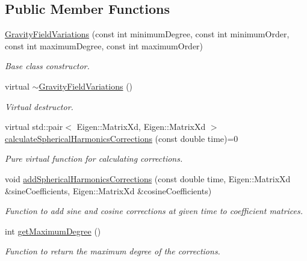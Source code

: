 \subsection*{Public Member Functions}
\begin{DoxyCompactItemize}
\item 
\hyperlink{classtudat_1_1gravitation_1_1GravityFieldVariations_acda33e409345701ee320c046987f3831}{Gravity\+Field\+Variations} (const int minimum\+Degree, const int minimum\+Order, const int maximum\+Degree, const int maximum\+Order)
\begin{DoxyCompactList}\small\item\em Base class constructor. \end{DoxyCompactList}\item 
virtual \hyperlink{classtudat_1_1gravitation_1_1GravityFieldVariations_abc4ba19f0c8593ef85932fc1724626ad}{$\sim$\+Gravity\+Field\+Variations} ()
\begin{DoxyCompactList}\small\item\em Virtual destructor. \end{DoxyCompactList}\item 
virtual std\+::pair$<$ Eigen\+::\+Matrix\+Xd, Eigen\+::\+Matrix\+Xd $>$ \hyperlink{classtudat_1_1gravitation_1_1GravityFieldVariations_ab42ff0b801e14ac4becc0619cc2a28d7}{calculate\+Spherical\+Harmonics\+Corrections} (const double time)=0
\begin{DoxyCompactList}\small\item\em Pure virtual function for calculating corrections. \end{DoxyCompactList}\item 
void \hyperlink{classtudat_1_1gravitation_1_1GravityFieldVariations_aafc95a18c23948b8185502d55dce013c}{add\+Spherical\+Harmonics\+Corrections} (const double time, Eigen\+::\+Matrix\+Xd \&sine\+Coefficients, Eigen\+::\+Matrix\+Xd \&cosine\+Coefficients)
\begin{DoxyCompactList}\small\item\em Function to add sine and cosine corrections at given time to coefficient matrices. \end{DoxyCompactList}\item 
int \hyperlink{classtudat_1_1gravitation_1_1GravityFieldVariations_adf0bf02857540c01e8ba09cfdb7f1297}{get\+Maximum\+Degree} ()
\begin{DoxyCompactList}\small\item\em Function to return the maximum degree of the corrections. \end{DoxyCompactList}\item 

\end{DoxyCompactItemize}
